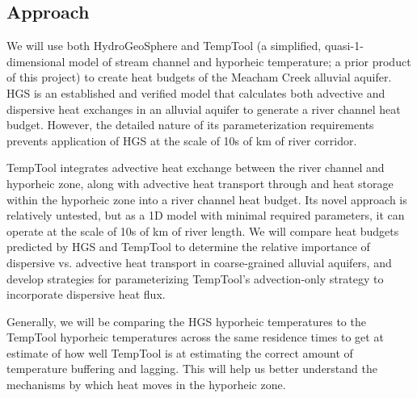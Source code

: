 \documentclass[a4paper]{article}
\begin{document}


\subsection*{Approach}
We will use both HydroGeoSphere and TempTool (a simplified, quasi-1-dimensional model of stream channel and hyporheic temperature; a prior product of this project) to create heat budgets of the Meacham Creek alluvial aquifer. HGS is an established and verified model that calculates both advective and dispersive heat exchanges in an alluvial aquifer to generate a river channel heat budget. However, the detailed nature of its parameterization requirements prevents application of HGS at the scale of 10s of km of river corridor. 

TempTool integrates advective heat exchange between the river channel and hyporheic zone, along with advective heat transport through and heat storage within the hyporheic zone into a river channel heat budget.  Its novel approach is relatively untested, but as a 1D model with minimal required parameters, it can operate at the scale of 10s of km of river length.  We will compare heat budgets predicted by HGS and TempTool to determine the relative importance of dispersive vs. advective heat transport in coarse-grained alluvial aquifers, and develop strategies for parameterizing TempTool’s advection-only strategy to incorporate dispersive heat flux. 

Generally, we will be comparing the HGS hyporheic temperatures to the TempTool hyporheic temperatures across the same residence times to get at estimate of how well TempTool is at estimating the correct amount of temperature buffering and lagging. This will help us better understand the mechanisms by which heat moves in the hyporheic zone. 


\printbibliography
\end{document}
